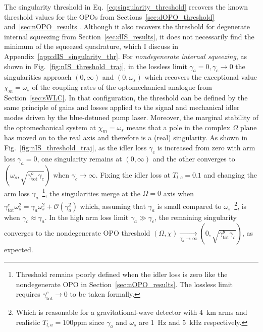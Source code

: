 The singularity threshold in Eq.~\ref{eq:singularity_threshold} recovers the known threshold values for the OPOs from Sections~\ref{sec:dOPO_threshold} and~\ref{sec:nOPO_results}. Although it also recovers the threshold for degenerate internal squeezing from Section~\ref{sec:dIS_results}, it does not necessarily find the minimum of the squeezed quadrature, which I discuss in Appendix~\ref{app:dIS_singularity_thr}.
For \emph{nondegenerate internal squeezing}, as shown in Fig.~\ref{fig:nIS_threshold_traj}, in the lossless limit $\gamma_a=0,\gamma_c\rightarrow0$ the singularities approach $(0,\infty)$ and $(0,\omega_s)$ which recovers the exceptional value $\chi_m=\omega_s$ of the coupling rates of the optomechanical analogue from Section~\ref{sec:sWLC}. In that configuration, the threshold can be defined by the same principle of gains and losses applied to the signal and mechanical idler modes driven by the blue-detuned pump laser. Moreover, the marginal stability of the optomechanical system at $\chi_m=\omega_s$ means that a pole in the complex $\Omega$ plane has moved on to the real axis and therefore is a (real) singularity. As shown in Fig.~\ref{fig:nIS_threshold_traj}, as the idler loss $\gamma_c$ is increased from zero with arm loss $\gamma_a=0$, one singularity remains at $(0,\infty)$ and the other converges to $(\omega_s,\sqrt{\gamma^b_\text{tot}\gamma_c})$ when $\gamma_c\rightarrow\infty$. Fixing the idler loss at $T_{l,c}=0.1$ and changing the arm loss $\gamma_a$~\footnote{Threshold remains poorly defined when the idler loss is zero like the nondegenerate OPO in Section~\ref{sec:nOPO_results}. The lossless limit requires $\gamma^c_\text{tot}\rightarrow0$ to be taken formally.}, the singularities merge at the $\Omega=0$ axis when $\gamma^c_\text{tot}\omega_s^2=\gamma_a\omega_s^2+\mathcal{O}(\gamma_a^2)$ which, assuming that $\gamma_a$ is small compared to $\omega_s$~\footnote{Which is reasonable for a gravitational-wave detector with 4~km arms and realistic $T_{l,a}=100\text{ppm}$ since $\gamma_a$ and $\omega_s$ are 1~Hz and 5~kHz respectively.}, is when $\gamma_c\approx\gamma_a$. In the high arm loss limit $\gamma_a\gg\gamma_c$, the remaining singularity converges to the nondegenerate OPO threshold $(\Omega,\chi)\xrightarrow[\gamma_a\rightarrow\infty]{}(0,\sqrt{\gamma^b_\mathrm{tot}\gamma_c})$, as expected.


